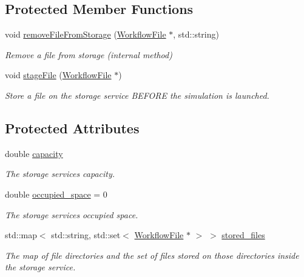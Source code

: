 \subsection*{Protected Member Functions}
\begin{DoxyCompactItemize}
\item 
void \hyperlink{classwrench_1_1_storage_service_a3eb93f5b38d6478ce1b6a43df1693234}{remove\+File\+From\+Storage} (\hyperlink{classwrench_1_1_workflow_file}{Workflow\+File} $\ast$, std\+::string)
\begin{DoxyCompactList}\small\item\em Remove a file from storage (internal method) \end{DoxyCompactList}\item 
void \hyperlink{classwrench_1_1_storage_service_ac054adcdeaf23cc0b8451df7926e8ae0}{stage\+File} (\hyperlink{classwrench_1_1_workflow_file}{Workflow\+File} $\ast$)
\begin{DoxyCompactList}\small\item\em Store a file on the storage service B\+E\+F\+O\+RE the simulation is launched. \end{DoxyCompactList}\end{DoxyCompactItemize}
\subsection*{Protected Attributes}
\begin{DoxyCompactItemize}
\item 
\mbox{\label{classwrench_1_1_storage_service_aa6697c2288acc1e053268de586ee1861}} 
double \hyperlink{classwrench_1_1_storage_service_aa6697c2288acc1e053268de586ee1861}{capacity}
\begin{DoxyCompactList}\small\item\em The storage service\textquotesingle{}s capacity. \end{DoxyCompactList}\item 
\mbox{\label{classwrench_1_1_storage_service_a62d4189d6a8698a4b55d4efe66495a04}} 
double \hyperlink{classwrench_1_1_storage_service_a62d4189d6a8698a4b55d4efe66495a04}{occupied\+\_\+space} = 0
\begin{DoxyCompactList}\small\item\em The storage service\textquotesingle{}s occupied space. \end{DoxyCompactList}\item 
\mbox{\label{classwrench_1_1_storage_service_a99675a336b15ef3138af2e33c38bc56d}} 
std\+::map$<$ std\+::string, std\+::set$<$ \hyperlink{classwrench_1_1_workflow_file}{Workflow\+File} $\ast$ $>$ $>$ \hyperlink{classwrench_1_1_storage_service_a99675a336b15ef3138af2e33c38bc56d}{stored\+\_\+files}
\begin{DoxyCompactList}\small\item\em The map of file directories and the set of files stored on those directories inside the storage service. \end{DoxyCompactList}\end{DoxyCompactItemize}
